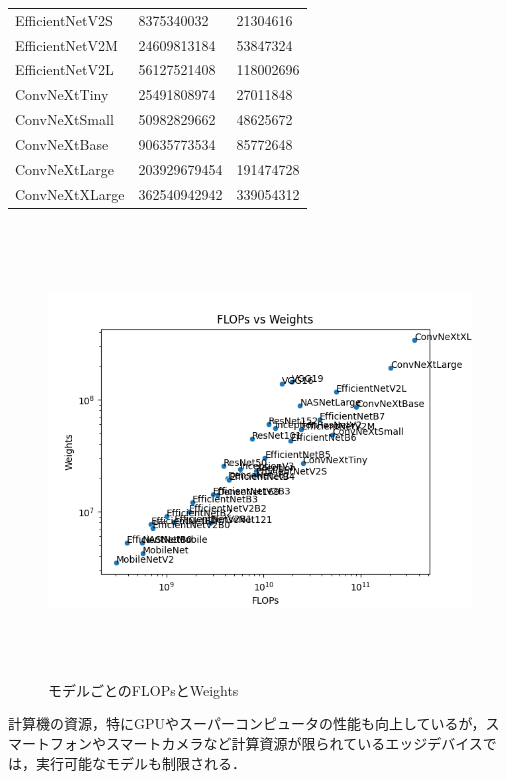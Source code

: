 \begin{table}[H]
\begin{tabular}{lll}
		EfficientNetV2S & 8375340032 & 21304616 \\ 
		EfficientNetV2M & 24609813184 & 53847324 \\ 
		EfficientNetV2L & 56127521408 & 118002696 \\ 
		ConvNeXtTiny & 25491808974 & 27011848 \\ 
		ConvNeXtSmall & 50982829662 & 48625672 \\ 
		ConvNeXtBase & 90635773534 & 85772648 \\ 
		ConvNeXtLarge & 203929679454 & 191474728 \\ 
		ConvNeXtXLarge & 362540942942 & 339054312 \\ 
		\hline
	\end{tabular}
\end{table}

\begin{figure} [H]
	\begin{center}
		\includegraphics[clip, height=12cm, bb=-60 0 640 480]{data/figure/models_info.png}
		\caption{モデルごとのFLOPsとWeights}
		\label{flops_vs_weights}
	\end{center}
\end{figure}


計算機の資源，特にGPUやスーパーコンピュータの性能も向上しているが，スマートフォンやスマートカメラなど計算資源が限られているエッジデバイスでは，実行可能なモデルも制限される．

